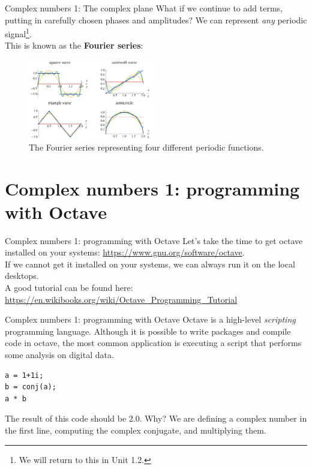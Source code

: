 \documentclass{beamer}
\begin{document}
\begin{frame}{Complex numbers 1: The complex plane}
\small
What if we continue to add terms, putting in carefully chosen phases and amplitudes?  We can represent \textit{any} periodic signal\footnote{We will return to this in Unit 1.2.}.  \\ \vspace{0.5cm}
This is known as the \textbf{\alert{Fourier series}}:
\begin{figure}
\centering
\includegraphics[width=0.5\textwidth]{figures/Fourier_Series.png}
\caption{\label{fig:fourier} The Fourier series representing four different periodic functions.}
\end{figure}
\end{frame}

\section{Complex numbers 1: programming with Octave}

\begin{frame}{Complex numbers 1: programming with Octave}
Let's take the time to get octave installed on your systems: \url{https://www.gnu.org/software/octave}.  \\ \vspace{0.5cm}
If we cannot get it installed on your systems, we can always run it on the local desktops. \\ \vspace{0.5cm}
A good tutorial can be found here: \\
\url{https://en.wikibooks.org/wiki/Octave_Programming_Tutorial}
\end{frame}

\begin{frame}[fragile]{Complex numbers 1: programming with Octave}
Octave is a high-level \textit{scripting} programming language.  Although it is possible to write packages and compile code in octave, the most common application is executing a script that performs some analysis on digital data. \\
\begin{verbatim}
a = 1+1i;
b = conj(a);
a * b
\end{verbatim}
The result of this code should be 2.0.  Why?  We are defining a complex number in the first line, computing the complex conjugate, and multiplying them.
\end{frame}
\end{document}
